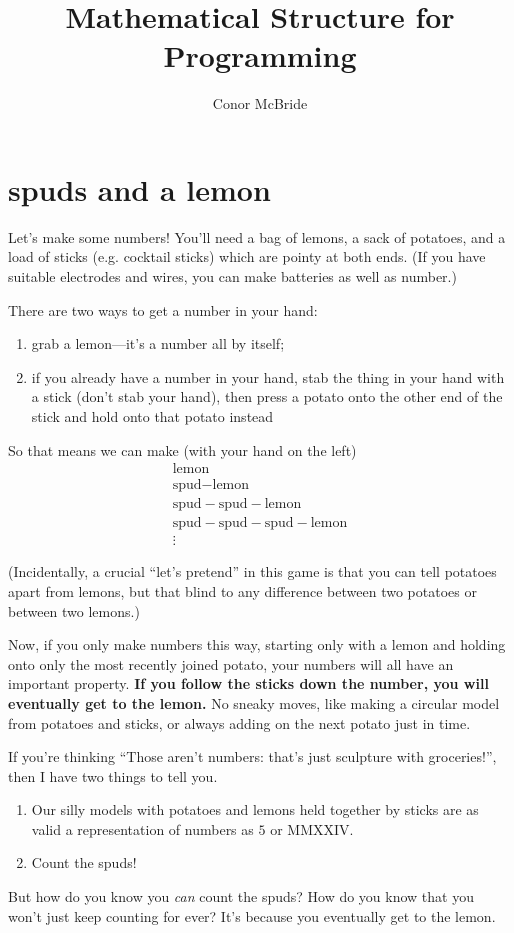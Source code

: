 \documentclass{book}
\begin{document}
\newtheorem{puz}{Puzzle}[chapter]


\title{Mathematical Structure for Programming}
\author{Conor McBride}
\maketitle

\chapter{spuds and a lemon}

Let's make some numbers! You'll need a bag of lemons, a sack of potatoes, and a load of sticks (e.g. cocktail sticks) which are pointy at both ends. (If you have suitable electrodes and wires, you can make batteries as well as number.)

There are two ways to get a number in your hand:
\begin{enumerate}
\item grab a lemon---it's a number all by itself;
  \item if you already have a number in your hand, stab the thing in your hand with a stick (don't stab your hand), then press a potato onto the other end of the stick and hold onto that potato instead
\end{enumerate}

\newcommand{\spud}{\mbox{spud}\!\!\!-\!\!\!}
\newcommand{\lemon}{\mbox{lemon}}
So that means we can make (with your hand on the left)
\[\begin{array}{l}
\lemon\\
\spud\lemon\\
\spud\spud\lemon\\
\spud\spud\spud\lemon\\
\vdots
\end{array}\]

(Incidentally, a crucial ``let's pretend'' in this game is that you can tell potatoes apart from lemons, but that blind to any difference between two potatoes or between two lemons.)

Now, if you only make numbers this way, starting only with a lemon and holding onto only the most recently joined potato, your numbers will all have an important property. \textbf{If you follow the sticks down the number, you will eventually get to the lemon.} No sneaky moves, like making a circular model from potatoes and sticks, or always adding on the next potato just in time.

If you're thinking ``Those aren't numbers: that's just sculpture with groceries!'', then I have two things to tell you.
\begin{enumerate}
\item Our silly models with potatoes and lemons held together by sticks are as valid a representation of numbers as $5$ or MMXXIV.
\item Count the spuds!
\end{enumerate}
But how do you know you \emph{can} count the spuds? How do you know that you won't just keep counting for ever? It's because you eventually get to the lemon.
\end{document}

